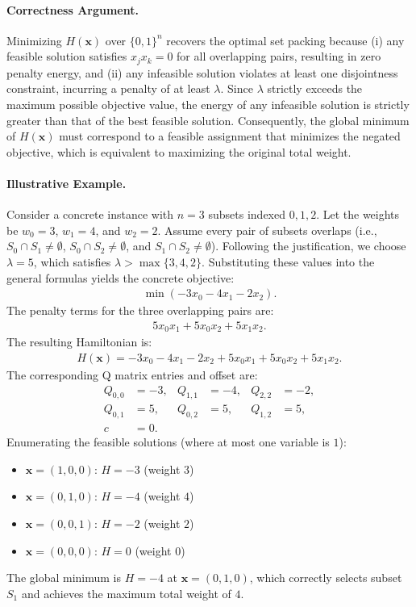 \documentclass[12pt]{article}
\begin{document}
\paragraph{Correctness Argument.}
Minimizing $H(\mathbf{x})$ over $\{0,1\}^n$ recovers the optimal set packing because (i) any feasible solution satisfies $x_j x_k = 0$ for all overlapping pairs, resulting in zero penalty energy, and (ii) any infeasible solution violates at least one disjointness constraint, incurring a penalty of at least $\lambda$. Since $\lambda$ strictly exceeds the maximum possible objective value, the energy of any infeasible solution is strictly greater than that of the best feasible solution. Consequently, the global minimum of $H(\mathbf{x})$ must correspond to a feasible assignment that minimizes the negated objective, which is equivalent to maximizing the original total weight.

\paragraph{Illustrative Example.}
Consider a concrete instance with $n=3$ subsets indexed $0, 1, 2$. Let the weights be $w_0 = 3$, $w_1 = 4$, and $w_2 = 2$. Assume every pair of subsets overlaps (i.e., $S_0 \cap S_1 \neq \emptyset$, $S_0 \cap S_2 \neq \emptyset$, and $S_1 \cap S_2 \neq \emptyset$). Following the justification, we choose $\lambda = 5$, which satisfies $\lambda > \max\{3, 4, 2\}$.
Substituting these values into the general formulas yields the concrete objective:
\begin{align}
\min \left( -3x_0 - 4x_1 - 2x_2 \right).
\end{align}
The penalty terms for the three overlapping pairs are:
\begin{align}
5x_0 x_1 + 5x_0 x_2 + 5x_1 x_2.
\end{align}
The resulting Hamiltonian is:
\begin{align}
H(\mathbf{x}) = -3x_0 - 4x_1 - 2x_2 + 5x_0 x_1 + 5x_0 x_2 + 5x_1 x_2.
\end{align}
The corresponding Q matrix entries and offset are:
\begin{align}
Q_{0,0} &= -3, & Q_{1,1} &= -4, & Q_{2,2} &= -2, \\
Q_{0,1} &= 5, & Q_{0,2} &= 5, & Q_{1,2} &= 5, \\
c &= 0.
\end{align}
Enumerating the feasible solutions (where at most one variable is $1$):
\begin{itemize}
\item $\mathbf{x} = (1,0,0)$: $H = -3$ (weight $3$)
\item $\mathbf{x} = (0,1,0)$: $H = -4$ (weight $4$)
\item $\mathbf{x} = (0,0,1)$: $H = -2$ (weight $2$)
\item $\mathbf{x} = (0,0,0)$: $H = 0$ (weight $0$)
\end{itemize}
The global minimum is $H = -4$ at $\mathbf{x} = (0,1,0)$, which correctly selects subset $S_1$ and achieves the maximum total weight of $4$.
\end{document}
